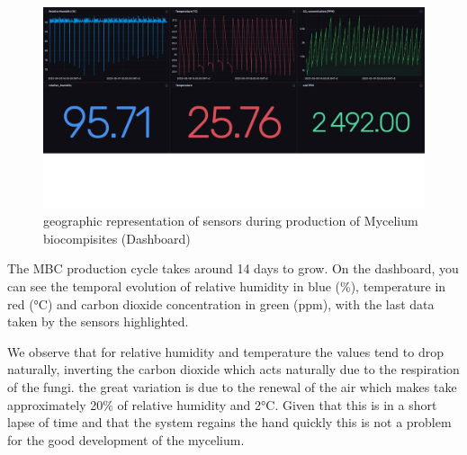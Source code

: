\begin{figure}[h]
    \centering
    \includegraphics[width=1.7\textwidth]{images/dashboard_all.png}
    \caption{geographic representation of sensors during production of Mycelium biocompisites (Dashboard)}
    \label{fig:dashboardbig}
\end{figure} 

The MBC production cycle takes around 14 days to grow. On the dashboard, you can see the temporal evolution of relative humidity in blue (\%), temperature in red (°C) and carbon dioxide concentration in green (ppm), with the last data taken by the sensors highlighted.

We observe that for relative humidity and temperature the values tend to drop naturally, inverting the carbon dioxide which acts naturally due to the respiration of the fungi. the great variation is due to the renewal of the air which makes take approximately 20\% of relative humidity and 2°C. Given that this is in a short lapse of time and that the system regains the hand quickly this is not a problem for the good development of the mycelium.



